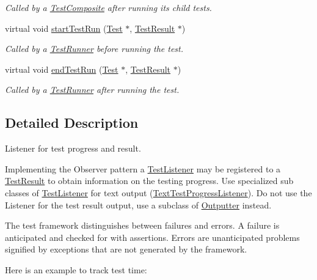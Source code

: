\begin{DoxyCompactItemize}
\begin{DoxyCompactList}\small\item\em Called by a \hyperlink{class_test_composite}{Test\+Composite} after running its child tests. \end{DoxyCompactList}\item 
virtual void \hyperlink{class_test_listener_a263428abdf29b2a7123af4096771925e}{start\+Test\+Run} (\hyperlink{class_test}{Test} $\ast$, \hyperlink{class_test_result}{Test\+Result} $\ast$)
\begin{DoxyCompactList}\small\item\em Called by a \hyperlink{class_test_runner}{Test\+Runner} before running the test. \end{DoxyCompactList}\item 
virtual void \hyperlink{class_test_listener_a0411708032f688f6ec234bcc5e089289}{end\+Test\+Run} (\hyperlink{class_test}{Test} $\ast$, \hyperlink{class_test_result}{Test\+Result} $\ast$)
\begin{DoxyCompactList}\small\item\em Called by a \hyperlink{class_test_runner}{Test\+Runner} after running the test. \end{DoxyCompactList}\end{DoxyCompactItemize}


\subsection{Detailed Description}
Listener for test progress and result.

Implementing the Observer pattern a \hyperlink{class_test_listener}{Test\+Listener} may be registered to a \hyperlink{class_test_result}{Test\+Result} to obtain information on the testing progress. Use specialized sub classes of \hyperlink{class_test_listener}{Test\+Listener} for text output (\hyperlink{class_text_test_progress_listener}{Text\+Test\+Progress\+Listener}). Do not use the Listener for the test result output, use a subclass of \hyperlink{class_outputter}{Outputter} instead. 

The test framework distinguishes between failures and errors. A failure is anticipated and checked for with assertions. Errors are unanticipated problems signified by exceptions that are not generated by the framework.

Here is an example to track test time\+:


